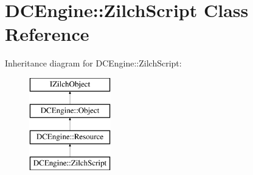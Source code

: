\hypertarget{classDCEngine_1_1ZilchScript}{\section{D\-C\-Engine\-:\-:Zilch\-Script Class Reference}
\label{classDCEngine_1_1ZilchScript}
}
Inheritance diagram for D\-C\-Engine\-:\-:Zilch\-Script\-:\begin{figure}[H]
\begin{center}
\leavevmode
\includegraphics[height=4.000000cm]{classDCEngine_1_1ZilchScript}
\end{center}
\end{figure}
